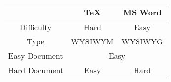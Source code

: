 \documentclass{oblivoir}
\begin{document}
	\begin{tabular}{c|c|c}
		\multicolumn{1}{c}{} & \TeX & MS Word \\
		\hline\hline
		Difficulty & Hard & Easy\\
		\hline
		Type & WYSIWYM & WYSIWYG \\
		\hline
		Easy Document & \multicolumn{2}{c}{Easy}\\
		\hline
		Hard Document & Easy & Hard
	\end{tabular}
\end{document}
